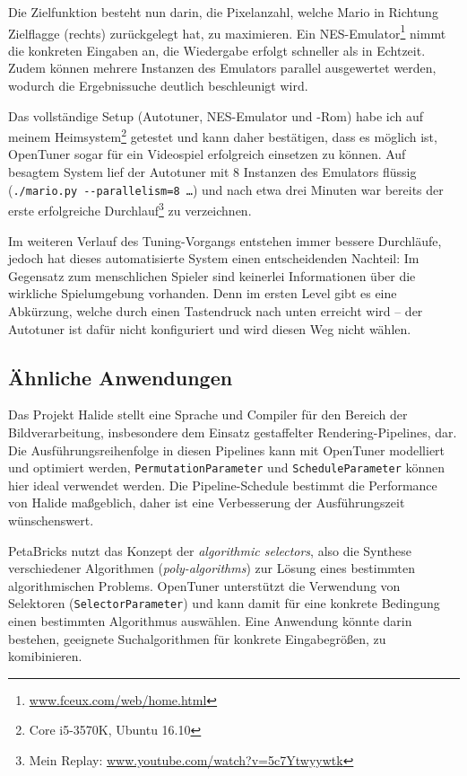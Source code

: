 \documentclass[a4paper,11pt]{scrartcl}
\begin{document}
Die Zielfunktion besteht nun darin, die Pixelanzahl, welche Mario in Richtung Zielflagge (rechts)
zurückgelegt hat, zu maximieren. Ein NES-Emulator\footnote{\url{www.fceux.com/web/home.html}}
nimmt die konkreten Eingaben an, die Wiedergabe erfolgt schneller als in Echtzeit. Zudem können
mehrere Instanzen des Emulators parallel ausgewertet werden, wodurch die Ergebnissuche 
deutlich beschleunigt wird. \newline

Das vollständige Setup (Autotuner, NES-Emulator und -Rom) habe ich auf meinem 
Heimsystem\footnote{Core i5-3570K, Ubuntu 16.10} getestet und kann daher 
bestätigen, dass es möglich ist, OpenTuner sogar für ein Videospiel erfolgreich
einsetzen zu können. Auf besagtem System lief der Autotuner mit 8 Instanzen des
Emulators flüssig (\texttt{./mario.py -{}-parallelism=8 \ldots}) und nach etwa drei Minuten
war bereits der erste erfolgreiche Durchlauf\footnote{Mein Replay: \url{www.youtube.com/watch?v=5c7Ytwyywtk}} zu verzeichnen. \newline

Im weiteren Verlauf des Tuning-Vorgangs entstehen immer bessere Durchläufe, jedoch
hat dieses automatisierte System einen entscheidenden Nachteil: Im Gegensatz zum menschlichen
Spieler sind keinerlei Informationen über die wirkliche Spielumgebung vorhanden.
Denn im ersten Level gibt es eine Abkürzung, welche durch einen Tastendruck nach 
unten erreicht wird -- der Autotuner ist dafür nicht konfiguriert und wird diesen Weg
nicht wählen.


\subsection{Ähnliche Anwendungen}
Das Projekt Halide \cite{halide} stellt eine Sprache und Compiler für den Bereich der 
Bildverarbeitung, insbesondere dem Einsatz gestaffelter Rendering-Pipelines, dar.
Die Ausführungsreihenfolge in diesen Pipelines kann mit OpenTuner modelliert und 
optimiert werden, \texttt{PermutationParameter} und \texttt{ScheduleParameter}
können hier ideal verwendet werden. Die Pipeline-Schedule bestimmt die Performance
von Halide maßgeblich, daher ist eine Verbesserung der Ausführungszeit wünschenswert. \newline

PetaBricks \cite{petab} nutzt das Konzept der \emph{algorithmic selectors}, also die 
Synthese verschiedener Algorithmen (\emph{poly-algorithms}) zur Lösung eines bestimmten algorithmischen Problems.
OpenTuner unterstützt die Verwendung von Selektoren (\texttt{SelectorParameter})
und kann damit für eine konkrete Bedingung einen bestimmten Algorithmus auswählen. 
Eine Anwendung könnte darin bestehen, geeignete Suchalgorithmen für konkrete
Eingabegrößen, zu komibinieren.
\end{document}
